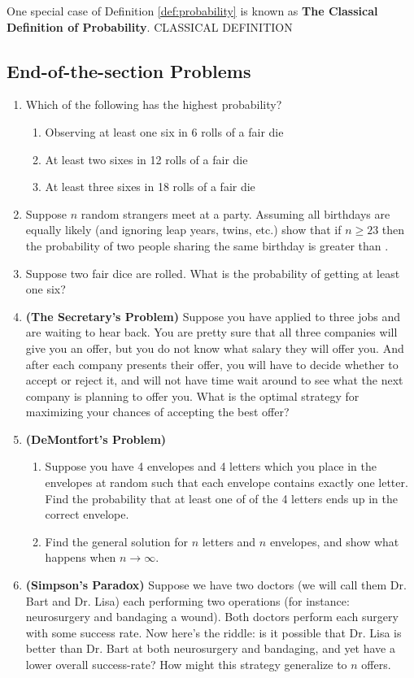 \documentclass{report}
\begin{document}
One special case of Definition \ref{def:probability} is known as \textbf{The Classical Definition of Probability}. \todo CLASSICAL DEFINITION

\subsection*{End-of-the-section Problems}\label{sec:problaw_eosp}

\begin{enumerate}
    \item Which of the following has the highest probability?
    \begin{enumerate}
        \item Observing at least one six in 6 rolls of a fair die
        \item At least two sixes in 12 rolls of a fair die
        \item At least three sixes in 18 rolls of a fair die
    \end{enumerate}
    \item Suppose $n$ random strangers meet at a party. Assuming all birthdays are equally likely (and ignoring leap years, twins, etc.) show that if $n\ge 23$ then the probability of two people sharing the same birthday is greater than .
    \item Suppose two fair dice are rolled. What is the probability of getting at least one six?
    \item\textbf{(The Secretary's Problem)}
    Suppose you have applied to three jobs and are waiting to hear back. You are pretty sure that all three companies will give you an offer, but you do not know what salary they will offer you. And after each company presents their offer, you will have to decide whether to accept or reject it, and will not have time wait around to see what the next company is planning to offer you. What is the optimal strategy for maximizing your chances of accepting the best offer?
    \item \textbf{(DeMontfort's Problem)} 
    \begin{enumerate}
        \item Suppose you have 4 envelopes and 4 letters which you place in the envelopes at random such that each envelope contains exactly one letter. Find the probability that at least one of of the 4 letters ends up in the correct envelope.
        \item Find the general solution for $n$ letters and $n$ envelopes, and show what happens when $n\to\infty$.
    \end{enumerate}
    \item \textbf{(Simpson's Paradox)} Suppose we have two doctors (we will call them Dr. Bart and Dr. Lisa) each performing two operations (for instance: neurosurgery and bandaging a wound). Both doctors perform each surgery with some success rate. Now here's the riddle: is it possible that Dr. Lisa is better than Dr. Bart at both neurosurgery and bandaging, and yet have a lower overall success-rate? How might this strategy generalize to $n$ offers.
\end{enumerate}
\end{document}

